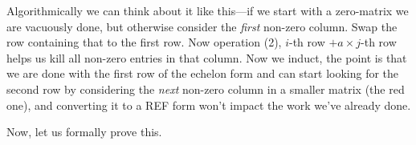 Algorithmically we can think about it like this---if we start
with a zero-matrix we are vacuously done, but otherwise consider the \emph{first}
non-zero column. Swap the row containing that to the first row.
Now operation (2), $i$-th row $+ a \times j$-th row helps us kill all non-zero entries in
that column. Now we induct, the point is that we are done with the first row of the echelon
form and can start looking for the second row by considering the \emph{next} non-zero column
in a smaller matrix (the red one), and converting it to a REF form won't impact the work we've
already done.

\begin{marginfigure}
\begin{center}
\end{center}
\end{marginfigure}

Now, let us formally prove this.

